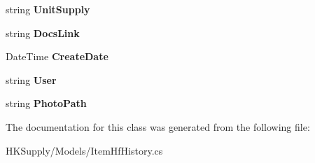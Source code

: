 \begin{DoxyCompactItemize}
\item 
\mbox{\label{class_h_k_supply_1_1_models_1_1_item_hf_history_a8170bca9aeaa61ee8732bcc15cde3a8b}} 
string {\bfseries Unit\+Supply}
\item 
\mbox{\label{class_h_k_supply_1_1_models_1_1_item_hf_history_a9a9ec7dd5104c1c72b369bb9f3511458}} 
string {\bfseries Docs\+Link}
\item 
\mbox{\label{class_h_k_supply_1_1_models_1_1_item_hf_history_a8297fdace3a3cfa2b6c71ee400bb63c3}} 
Date\+Time {\bfseries Create\+Date}
\item 
\mbox{\label{class_h_k_supply_1_1_models_1_1_item_hf_history_aa540dc1ee08e6cf819664ace9b628e14}} 
string {\bfseries User}
\item 
\mbox{\label{class_h_k_supply_1_1_models_1_1_item_hf_history_a959d7272722b81117dde9d5220812b5a}} 
string {\bfseries Photo\+Path}
\end{DoxyCompactItemize}


The documentation for this class was generated from the following file\+:\begin{DoxyCompactItemize}
\item 
H\+K\+Supply/\+Models/Item\+Hf\+History.\+cs\end{DoxyCompactItemize}
